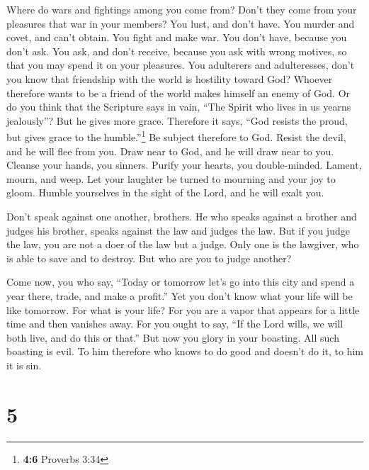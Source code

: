  Where do wars and fightings among you come from? Don't
they come from your pleasures that war in your members? 
You lust, and don't have. You murder and covet, and can't obtain. You
fight and make war. You don't have, because you don't ask.
 You ask, and don't receive, because you ask with wrong
motives, so that you may spend it on your pleasures.  You
adulterers and adulteresses, don't you know that friendship with the
world is hostility toward God? Whoever therefore wants to be a friend of
the world makes himself an enemy of God.  Or do you think
that the Scripture says in vain, ``The Spirit who lives in us yearns
jealously''?  But he gives more grace. Therefore it says,
``God resists the proud, but gives grace to the humble.''\footnote{\textbf{4:6}
  Proverbs 3:34}  Be subject therefore to God. Resist the
devil, and he will flee from you.  Draw near to God, and
he will draw near to you. Cleanse your hands, you sinners. Purify your
hearts, you double-minded.  Lament, mourn, and weep. Let
your laughter be turned to mourning and your joy to gloom.
 Humble yourselves in the sight of the Lord, and he will
exalt you.

 Don't speak against one another, brothers. He who speaks
against a brother and judges his brother, speaks against the law and
judges the law. But if you judge the law, you are not a doer of the law
but a judge.  Only one is the lawgiver, who is able to
save and to destroy. But who are you to judge another?

 Come now, you who say, ``Today or tomorrow let's go into
this city and spend a year there, trade, and make a profit.''
 Yet you don't know what your life will be like tomorrow.
For what is your life? For you are a vapor that appears for a little
time and then vanishes away.  For you ought to say, ``If
the Lord wills, we will both live, and do this or that.''
 But now you glory in your boasting. All such boasting is
evil.  To him therefore who knows to do good and doesn't
do it, to him it is sin.

\hypertarget{section-4}{%
\section{5}\label{section-4}}

